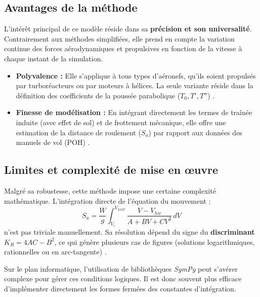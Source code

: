 	\vspace*{1cm}

	\subsection{Avantages de la méthode}
	L'intérêt principal de ce modèle réside dans sa \textbf{précision et son universalité}. Contrairement aux méthodes simplifiées, elle prend en compte la variation continue des forces aérodynamiques et propulsives en fonction de la vitesse à chaque instant de la simulation. 
	\begin{itemize}
		\item \textbf{Polyvalence :} Elle s'applique à tous types d'aéronefs, qu'ils soient propulsés par turboréacteurs ou par moteurs à hélices. La seule variante réside dans la définition des coefficients de la poussée parabolique ($T_0, T', T''$) .
		\item \textbf{Finesse de modélisation :} En intégrant directement les termes de traînée induite (avec effet de sol) et de frottement mécanique, elle offre une estimation de la distance de roulement ($S_a$) par rapport aux données des manuels de vol (POH) .
	\end{itemize}
	
	\subsection{Limites et complexité de mise en œuvre}
	Malgré sa robustesse, cette méthode impose une certaine complexité mathématique. L'intégration directe de l'équation du mouvement  :
	\[ S_a = \frac{W}{g} \int_{V_i}^{V_{LOF}} \frac{V - V_{hw}}{A + BV + CV^2} \, dV \]
	n'est pas triviale manuellement. Sa résolution dépend du signe du \textbf{discriminant} $K_R = 4AC - B^2$, ce qui génère plusieurs cas de figures (solutions logarithmiques, rationnelles ou en arc-tangente) .
	
	Sur le plan informatique, l'utilisation de bibliothèques \textit{SymPy} peut s'avérer complexe pour gérer ces conditions logiques. Il est donc souvent plus efficace d'implémenter directement les formes fermées des constantes d'intégration.
	
	
	

			
			\vspace{1cm}
		

		
